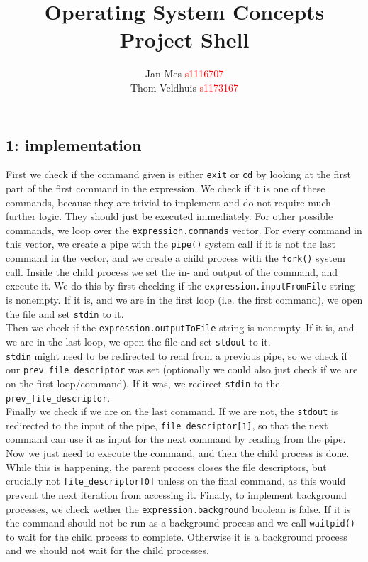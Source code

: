 \documentclass[a4paper]{article}
\title{Operating System Concepts\\Project Shell}
\author{Jan Mes \hfill \textcolor{red}{s1116707} \\
        Thom Veldhuis \textcolor{red}{s1173167}}
\begin{document}
\maketitle 
\subsection*{1: implementation}
First we check if the command given is either \verb|exit| or \verb|cd| by looking at the first part of the first command in the expression.
We check if it is one of these commands, because they are trivial to implement and do not require much further logic. 
They should just be executed immediately. \smallbreak
For other possible commands, we loop over the \verb|expression.commands| vector. 
For every command in this vector, we create a pipe with the \verb|pipe()| system call if it is not the last command in the vector, 
and we create a child process with the \verb|fork()| system call. \smallbreak
Inside the child process we set the in- and output of the command, and execute it. 
We do this by first checking if the \verb|expression.inputFromFile| string is nonempty. 
If it is, and we are in the first loop (i.e. the first command), we open the file and set \verb|stdin| to it. \\
Then we check if the \verb|expression.outputToFile| string is nonempty.
If it is, and we are in the last loop, we open the file and set \verb|stdout| to it. \\
\verb|stdin| might need to be redirected to read from a previous pipe,
so we check if our \verb|prev_file_descriptor| was set (optionally we could also just check if we are on the first loop/command).
If it was, we redirect \verb|stdin| to the \verb|prev_file_descriptor|. \\
Finally we check if we are on the last command. 
If we are not, the \verb|stdout| is redirected to the input of the pipe, \verb|file_descriptor[1]|, 
so that the next command can use it as input for the next command by reading from the pipe. \\
Now we just need to execute the command, and then the child process is done. \smallbreak
While this is happening, the parent process closes the file descriptors, 
but crucially not \verb|file_descriptor[0]| unless on the final command, as this would prevent the next iteration from accessing it.
Finally, to implement background processes, we check wether the \verb|expression.background| boolean is false.
If it is the command should not be run as a background process and we call \verb|waitpid()| to wait for the child process to complete.
Otherwise it is a background process and we should not wait for the child processes.
\end{document}
